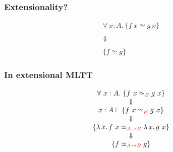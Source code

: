 \documentclass[11pt]{beamer}
\begin{document}
\begin{frame}
  \frametitle{Extensionality?}

\Large

  \[
  \begin{array}{c}
    \forall\ x : A.\ \{ f\ x \simeq g\ x \}
    \\    \\
    \Downarrow
    \\    \\
    \{ f \simeq g \}
  \end{array}
  \]

  \end{frame}

\newcommand{\csimeq}[1]{\simeq_{\color{red}#1}}

\begin{frame}
  \frametitle{In extensional MLTT}

\Large

  \[
  \begin{array}{c}
    \forall\ x : A.\ \{ f\ x \csimeq{B} g\ x\}
    \\    
    \Downarrow
    \\    
    x : A \vdash \{ f\ x \csimeq{B} g\ x \}
    \\
    \Downarrow
    \\    
    \{ \lambda\, x.\, f\ x \csimeq{A\to B} \lambda\, x.\, g\ x \}
    \\
    \Downarrow
    \\    
    \{ f \csimeq{A\to B} g \}
  \end{array}
  \]

  \vspace{1cm}

\pause
  \begin{center}
\color{purple}
\Large
    \end{center}

  \end{frame}
\end{document}
